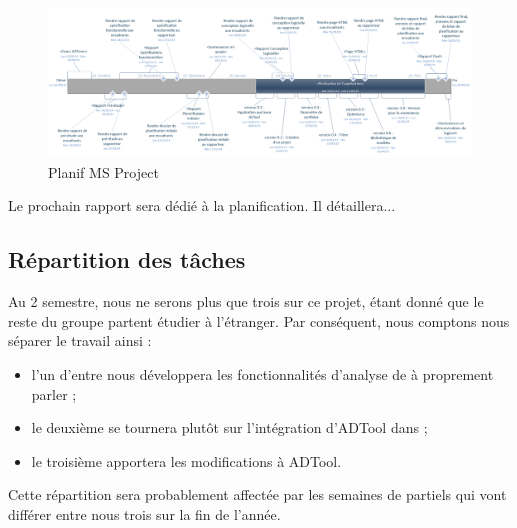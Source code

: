 		\begin{landscape}
			\begin{figure}
				\centering
				\includegraphics[height=0.50\textwidth]{figure/planification.png}
				\caption{Planif MS Project}
				\label{fig:planif}
			\end{figure}
		\end{landscape}

   		Le prochain rapport sera dédié à la planification. Il détaillera... %


	\subsection{Répartition des tâches}
		Au 2 semestre, nous ne serons plus que trois %
		sur ce projet, étant donné que le reste du groupe partent étudier à l'étranger. Par conséquent, nous comptons nous séparer le travail ainsi :
		\begin{itemize} %
			\item l'un d'entre nous développera les fonctionnalités d'analyse de \glasir à proprement parler ;
			\item le deuxième se tournera plutôt sur l'intégration d'ADTool dans \glasir ;
			\item le troisième apportera les modifications à ADTool.
		\end{itemize}
		Cette répartition sera probablement affectée par les semaines de partiels qui vont différer entre nous trois sur la fin de l'année.
